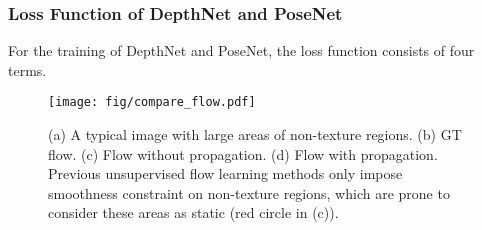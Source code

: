 \documentclass[10pt,twocolumn,letterpaper]{article}
\begin{document}
\begin{table}[htbp]
  \centering
  \renewcommand\tabcolsep{1.8pt}
  \newcommand{\tabincell}[2]{\begin{tabular}{@{}#1@{}}#2\end{tabular}}
  \label{tab:scannet1}\vspace{-1mm}
  \caption{Evaluation of depth on Scannet and KITTI datasets. K:KITTI, S:Scannet, :collapse, F-sup:flow supervision.}
\end{table}

\subsubsection{Loss Function of DepthNet and PoseNet}

\quad For the training of DepthNet and PoseNet, the loss function consists of four terms.

\begin{figure}[htbp]
\vspace{-3mm}
\begin{center}
  \texttt{[image: fig/compare\_flow.pdf]}
\end{center}
   \vspace{-3mm}
   \caption{(a) A typical image with large areas of non-texture regions. (b) GT flow. (c) Flow without propagation. (d) Flow with propagation. Previous unsupervised flow learning methods only impose smoothness constraint on non-texture regions, which are prone to consider these areas as static (red circle in (c)).}
\label{fig:compare_flow}
\vspace{-3mm}
\end{figure}
\end{document}
